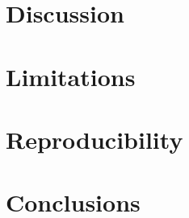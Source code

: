 \documentclass[11pt]{article}
\begin{document}
\section{Discussion}
\label{sec:discussion}


\section{Limitations}
\label{sec:limitations}


\section{Reproducibility}
\label{sec:reproducibility}


\section{Conclusions}
\label{sec:conclusions}




\end{document}

